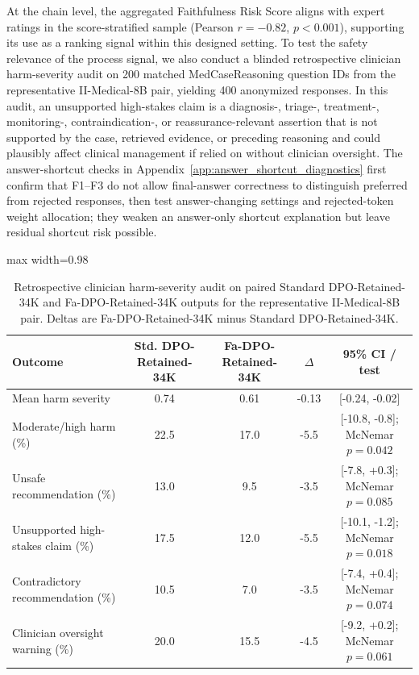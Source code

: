 \documentclass[a4paper,fleqn,doubleblind]{cas-sc}
\begin{document}
At the chain level, the aggregated Faithfulness Risk Score aligns with expert ratings in the score-stratified sample (Pearson $r=-0.82$, $p<0.001$), supporting its use as a ranking signal within this designed setting. To test the safety relevance of the process signal, we also conduct a blinded retrospective clinician harm-severity audit on 200 matched MedCaseReasoning question IDs from the representative II-Medical-8B pair, yielding 400 anonymized responses. In this audit, an unsupported high-stakes claim is a diagnosis-, triage-, treatment-, monitoring-, contraindication-, or reassurance-relevant assertion that is not supported by the case, retrieved evidence, or preceding reasoning and could plausibly affect clinical management if relied on without clinician oversight. The answer-shortcut checks in Appendix~\ref{app:answer_shortcut_diagnostics} first confirm that F1--F3 do not allow final-answer correctness to distinguish preferred from rejected responses, then test answer-changing settings and rejected-token weight allocation; they weaken an answer-only shortcut explanation but leave residual shortcut risk possible.

\begin{table}[htbp]
    \centering
    \footnotesize
    \caption{Retrospective clinician harm-severity audit on paired Standard DPO-Retained-34K and Fa-DPO-Retained-34K outputs for the representative II-Medical-8B pair. Deltas are Fa-DPO-Retained-34K minus Standard DPO-Retained-34K.}
    \label{tab:harm_severity_audit}
    \begin{adjustbox}{max width=0.98\textwidth}
    \begin{tabular}{lcccc}
        \toprule
        \textbf{Outcome} & \textbf{Std. DPO-Retained-34K} & \textbf{Fa-DPO-Retained-34K} & \textbf{$\Delta$} & \textbf{95\% CI / test} \\
        \midrule
        Mean harm severity & 0.74 & 0.61 & -0.13 & [-0.24, -0.02] \\
        Moderate/high harm (\%) & 22.5 & 17.0 & -5.5 & [-10.8, -0.8]; McNemar $p=0.042$ \\
        Unsafe recommendation (\%) & 13.0 & 9.5 & -3.5 & [-7.8, +0.3]; McNemar $p=0.085$ \\
        Unsupported high-stakes claim (\%) & 17.5 & 12.0 & -5.5 & [-10.1, -1.2]; McNemar $p=0.018$ \\
        Contradictory recommendation (\%) & 10.5 & 7.0 & -3.5 & [-7.4, +0.4]; McNemar $p=0.074$ \\
        Clinician oversight warning (\%) & 20.0 & 15.5 & -4.5 & [-9.2, +0.2]; McNemar $p=0.061$ \\
        \bottomrule
    \end{tabular}
    \end{adjustbox}
\end{table}
\end{document}
